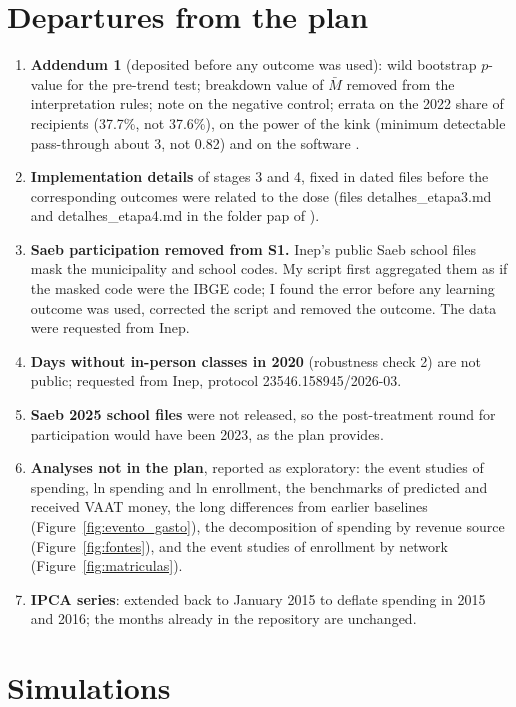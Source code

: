 \documentclass[11pt]{article}
\begin{document}
\appendix

\section{Departures from the plan}\label{app:desvios}

\begin{enumerate}[label=A\arabic*.]
\item \textbf{Addendum 1} (deposited before any outcome was used): wild bootstrap $p$-value for the pre-trend test; breakdown value of $\bar M$ removed from the interpretation rules; note on the negative control; errata on the 2022 share of recipients (37.7\%, not 37.6\%), on the power of the kink (minimum detectable pass-through about 3, not 0.82) and on the software \citep{cunha2026add}.
\item \textbf{Implementation details} of stages 3 and 4, fixed in dated files before the corresponding outcomes were related to the dose (files detalhes\_etapa3.md and detalhes\_etapa4.md in the folder pap of \citealp{cunha2026a}).
\item \textbf{Saeb participation removed from S1.} Inep's public Saeb school files mask the municipality and school codes. My script first aggregated them as if the masked code were the IBGE code; I found the error before any learning outcome was used, corrected the script and removed the outcome. The data were requested from Inep.
\item \textbf{Days without in-person classes in 2020} (robustness check 2) are not public; requested from Inep, protocol 23546.158945/2026-03.
\item \textbf{Saeb 2025 school files} were not released, so the post-treatment round for participation would have been 2023, as the plan provides.
\item \textbf{Analyses not in the plan}, reported as exploratory: the event studies of spending, ln spending and ln enrollment, the benchmarks of predicted and received VAAT money, the long differences from earlier baselines (Figure~\ref{fig:evento_gasto}), the decomposition of spending by revenue source (Figure~\ref{fig:fontes}), and the event studies of enrollment by network (Figure~\ref{fig:matriculas}).
\item \textbf{IPCA series}: extended back to January 2015 to deflate spending in 2015 and 2016; the months already in the repository are unchanged.
\end{enumerate}

\section{Simulations}\label{app:sim}
\end{document}
